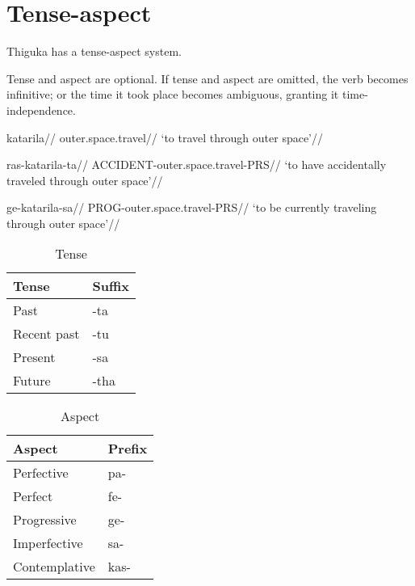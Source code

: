 
\section{Tense-aspect}
Thiguka has a tense-aspect system.

Tense and aspect are optional.
If tense and aspect are omitted, the verb becomes infinitive; or the time
it took place becomes ambiguous, granting it time-independence.

\ex
\begingl
    \gla katarila//
    \glb outer.space.travel//
    \glft `to travel through outer space'//
\endgl
\xe

\ex
\begingl
    \gla ras-katarila-ta//
    \glb ACCIDENT-outer.space.travel-PRS//
    \glft `to have accidentally traveled through outer space'//
\endgl
\xe

\ex
\begingl
    \gla ge-katarila-sa//
    \glb PROG-outer.space.travel-PRS//
    \glft `to be currently traveling through outer space'//
\endgl
\xe

\begin{table}[H]
    \centering
    \caption{Tense}
    \begin{tabularx}{8cm}{|X|X|}
        \hline
        \textbf{Tense} & \textbf{Suffix} \\
        \hline
        Past & -ta \\
        Recent past & -tu \\
        Present & -sa \\
        Future & -tha \\
        \hline
    \end{tabularx}
\end{table}

\begin{table}[H]
    \centering
    \caption{Aspect}
    \begin{tabularx}{8cm}{|X|X|}
        \hline
        \textbf{Aspect} & \textbf{Prefix} \\
        \hline
        Perfective & pa- \\
        Perfect & fe- \\
        Progressive & ge- \\
        Imperfective & sa- \\
        Contemplative & kas- \\
        \hline
    \end{tabularx}
\end{table}
